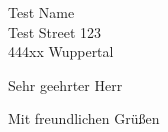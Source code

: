 \documentclass[10pt,a4paper]{scrlttr2}
\begin{document}
\begin{letter}{Test Name\\ Test Street 123\\444xx Wuppertal}
    
\opening{Sehr geehrter Herr}
		\closing{Mit freundlichen Grüßen}
\end{letter}
\end{document}
